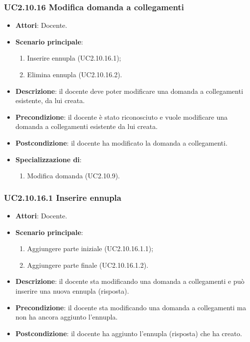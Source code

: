 \subsubsection{UC2.10.16 Modifica domanda a collegamenti}
\begin{itemize}
\item \textbf{Attori}: Docente.
\item \textbf{Scenario principale}:
\begin{enumerate}
\item Inserire ennupla (UC2.10.16.1);
\item Elimina ennupla (UC2.10.16.2).
\end{enumerate}
\item \textbf{Descrizione}: il docente deve poter modificare una domanda a collegamenti esistente, da lui creata.
\item \textbf{Precondizione}: il docente è stato riconosciuto e vuole modificare una domanda a collegamenti esistente da lui creata.
\item \textbf{Postcondizione}: il docente ha modificato la domanda a collegamenti.
\item \textbf{Specializzazione di}:
\begin{enumerate}
\item Modifica domanda (UC2.10.9).
\end{enumerate}
\end{itemize}
\subsubsection{UC2.10.16.1 Inserire ennupla}
\begin{itemize}
\item \textbf{Attori}: Docente.
\item \textbf{Scenario principale}:
\begin{enumerate}
\item Aggiungere parte iniziale (UC2.10.16.1.1);
\item Aggiungere parte finale (UC2.10.16.1.2).
\end{enumerate}
\item \textbf{Descrizione}: il docente sta modificando una domanda a collegamenti e può inserire una nuova ennupla (risposta).
\item \textbf{Precondizione}: il docente sta modificando una domanda a collegamenti ma non ha ancora aggiunto l'ennupla.
\item \textbf{Postcondizione}: il docente ha aggiunto l'ennupla (risposta) che ha creato.
\end{itemize}

